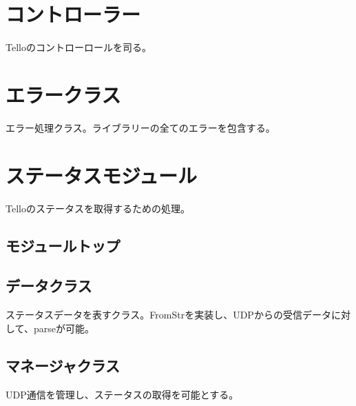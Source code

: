 \documentclass[a4paper, 12pt]{ltjsarticle}
\begin{document}
\section {コントローラー}
Telloのコントローロールを司る。



\section {エラークラス}
エラー処理クラス。ライブラリーの全てのエラーを包含する。


\section {ステータスモジュール}
Telloのステータスを取得するための処理。
\subsection {モジュールトップ}


\subsection {データクラス}
ステータスデータを表すクラス。FromStrを実装し、UDPからの受信データに対して、parseが可能。


\subsection {マネージャクラス}
UDP通信を管理し、ステータスの取得を可能とする。

\end{document}
